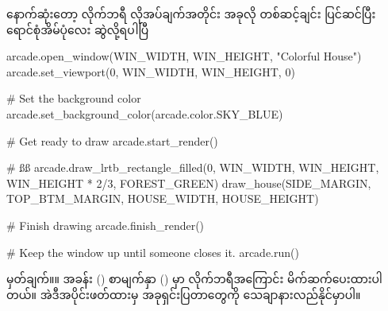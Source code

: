 နောက်ဆုံးတော့  လိုက်ဘရီ လိုအပ်ချက်အတိုင်း အခုလို တစ်ဆင့်ချင်း ပြင်ဆင်ပြီး  ရောင်စုံအိမ်ပုံလေး ဆွဲလို့ရပါပြီ
%
\begin{py}
arcade.open_window(WIN_WIDTH, WIN_HEIGHT, "Colorful House")
arcade.set_viewport(0, WIN_WIDTH, WIN_HEIGHT, 0)

# Set the background color
arcade.set_background_color(arcade.color.SKY_BLUE)

# Get ready to draw
arcade.start_render()

# ßß 
arcade.draw_lrtb_rectangle_filled(0, WIN_WIDTH, 
                                  WIN_HEIGHT, WIN_HEIGHT * 2/3, 
                                  FOREST_GREEN)
draw_house(SIDE_MARGIN, TOP_BTM_MARGIN, HOUSE_WIDTH, HOUSE_HEIGHT)

# Finish drawing
arcade.finish_render()

# Keep the window up until someone closes it.
arcade.run()
\end{py}
%
မှတ်ချက်။\qquad ။ အခန်း (\fRefNo{\ref{ch:ch07ctlstmt}}) စာမျက်နှာ (\fRefNo{\pageref{sec:python_arcade}}) မှာ  လိုက်ဘရီအကြောင်း မိက်ဆက်ပေးထားပါတယ်။ အဲဒီအပိုင်းဖတ်ထားမှ အခုရှင်းပြတာတွေကို သေချာနားလည်နိုင်မှာပါ။ 

